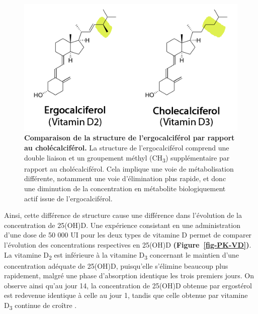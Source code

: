 \documentclass[
  a4paper,
  DIV=11,
  numbers=noendperiod,
  listof=totoc]{scrreprt}
\begin{document}
\begin{figure}
\includegraphics{figures/ergo_vs_chole.png} 
\caption[\textbf{Comparaison de la structure de l'ergocalciférol par rapport au cholécalciférol.}]{\textbf{Comparaison de la structure de l'ergocalciférol par rapport au cholécalciférol.} La structure de l'ergocalciférol comprend une double liaison et un groupement méthyl (CH\textsubscript{3}) supplémentaire par rapport au cholécalciférol. Cela implique une voie de métabolisation différente, notamment une voie d'élimination plus rapide, et donc une diminution de la concentration en métabolite biologiquement actif issue de l'ergocalciférol. \cite{Houghton.2006}}
\label{fig:ergo-struc}
\end{figure}

Ainsi, cette différence de structure cause une différence dans
l'évolution de la concentration de 25(OH)D. Une expérience consistant en
une administration d'une dose de 50 000 UI pour les deux types de
vitamine D permet de comparer l'évolution des concentrations respectives
en 25(OH)D \textbf{(Figure~\ref{fig-PK-VD})}. La vitamine
D\textsubscript{2} est inférieure à la vitamine D\textsubscript{3}
concernant le maintien d'une concentration adéquate de 25(OH)D,
puisqu'elle s'élimine beaucoup plus rapidement, malgré une phase
d'absorption identique les trois premiers jours. On observe ainsi qu'au
jour 14, la concentration de 25(OH)D obtenue par ergostérol est
redevenue identique à celle au jour 1, tandis que celle obtenue par
vitamine D\textsubscript{3} continue de croître \autocite{Armas.2004}.
\end{document}
